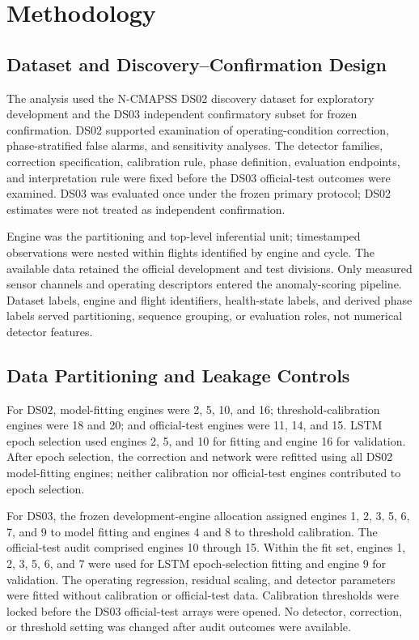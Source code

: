 \documentclass[10pt,twocolumn]{article}
\begin{document}
\section{Methodology}\label{methodology}

\subsection{Dataset and Discovery--Confirmation Design}\label{dataset-and-discoveryconfirmation-design}

The analysis used the N-CMAPSS DS02 discovery dataset for exploratory development and the DS03 independent confirmatory subset for frozen confirmation. DS02 supported examination of operating-condition correction, phase-stratified false alarms, and sensitivity analyses. The detector families, correction specification, calibration rule, phase definition, evaluation endpoints, and interpretation rule were fixed before the DS03 official-test outcomes were examined. DS03 was evaluated once under the frozen primary protocol; DS02 estimates were not treated as independent confirmation.

Engine was the partitioning and top-level inferential unit; timestamped observations were nested within flights identified by engine and cycle. The available data retained the official development and test divisions. Only measured sensor channels and operating descriptors entered the anomaly-scoring pipeline. Dataset labels, engine and flight identifiers, health-state labels, and derived phase labels served partitioning, sequence grouping, or evaluation roles, not numerical detector features.

\subsection{Data Partitioning and Leakage Controls}\label{data-partitioning-and-leakage-controls}

For DS02, model-fitting engines were 2, 5, 10, and 16; threshold-calibration engines were 18 and 20; and official-test engines were 11, 14, and 15. LSTM epoch selection used engines 2, 5, and 10 for fitting and engine 16 for validation. After epoch selection, the correction and network were refitted using all DS02 model-fitting engines; neither calibration nor official-test engines contributed to epoch selection.

For DS03, the frozen development-engine allocation assigned engines 1, 2, 3, 5, 6, 7, and 9 to model fitting and engines 4 and 8 to threshold calibration. The official-test audit comprised engines 10 through 15. Within the fit set, engines 1, 2, 3, 5, 6, and 7 were used for LSTM epoch-selection fitting and engine 9 for validation. The operating regression, residual scaling, and detector parameters were fitted without calibration or official-test data. Calibration thresholds were locked before the DS03 official-test arrays were opened. No detector, correction, or threshold setting was changed after audit outcomes were available.
\end{document}
